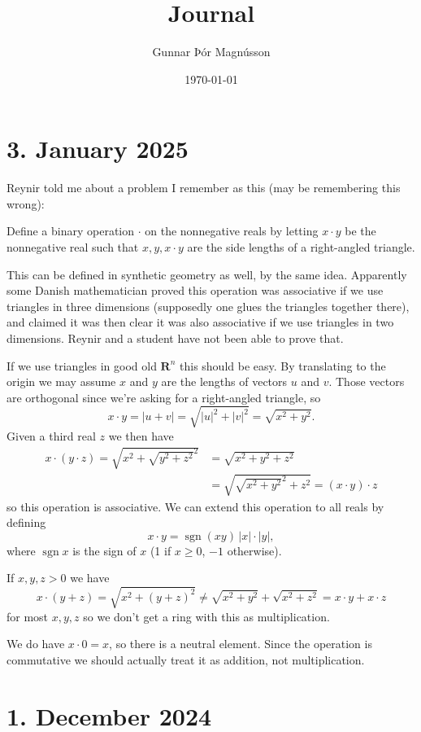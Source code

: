 \documentclass[11pt]{amsart}
\author{Gunnar Þór Magnússon}
\date{\today}
\title{Journal}
\theoremstyle{definition}
\def\RR{\mathbf{R}}
\DeclareMathOperator{\sgn}{sgn}
\begin{document}
\maketitle


\section{3. January 2025}

Reynir told me about a problem I remember as this (may be remembering this wrong):

Define a binary operation $\cdot$ on the nonnegative reals by letting $x \cdot y$ be the nonnegative real such that $x, y, x \cdot y$ are the side lengths of a right-angled triangle.

This can be defined in synthetic geometry as well, by the same idea.
Apparently some Danish mathematician proved this operation was associative if we use triangles in three dimensions (supposedly one glues the triangles together there), and claimed it was then clear it was also associative if we use triangles in two dimensions.
Reynir and a student have not been able to prove that.

If we use triangles in good old $\RR^n$ this should be easy.
By translating to the origin we may assume $x$ and $y$ are the lengths of vectors $u$ and $v$.
Those vectors are orthogonal since we're asking for a right-angled triangle, so
\[
x \cdot y
= |u + v|
= \sqrt{|u|^2 + |v|^2}
= \sqrt{x^2 + y^2}.
\]
Given a third real $z$ we then have
\begin{align*}
x \cdot (y \cdot z)
= \sqrt{x^2 + \sqrt{y^2 + z^2}^2}
&= \sqrt{x^2 + y^2 + z^2}
\\
&= \sqrt{\sqrt{x^2 + y^2}^2 + z^2}
= (x \cdot y) \cdot z
\end{align*}
so this operation is associative.
We can extend this operation to all reals by defining
\[
x \cdot y
= \sgn(xy) \, |x| \cdot |y|,
\]
where $\sgn x$ is the sign of $x$ (1 if $x \geq 0$, $-1$ otherwise).

If $x,y,z > 0$ we have
\[
x \cdot (y + z)
= \sqrt{x^2 + (y+z)^2}
\not= \sqrt{x^2 + y^2} + \sqrt{x^2 + z^2}
= x \cdot y + x \cdot z
\]
for most $x,y,z$ so we don't get a ring with this as multiplication.

We do have $x \cdot 0 = x$, so there is a neutral element.
Since the operation is commutative we should actually treat it as addition, not multiplication.


\section{1. December 2024}
\end{document}
